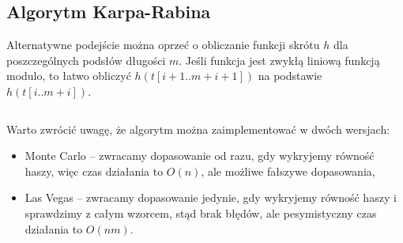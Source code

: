 \subsection{Algorytm Karpa-Rabina}

Alternatywne podejście można oprzeć o obliczanie funkcji skrótu $h$ dla poszczególnych podsłów długości $m$. Jeśli funkcja jest zwykłą liniową funkcją modulo, to łatwo obliczyć $h(t[i + 1..m + i + 1])$ na podstawie $h(t[i..m + i])$.

\begin{code}
\inputminted{python}{code/exact-string-matching/karp-rabin.py}
\label{alg:exact-string-matching-karp-rabin}
\end{code}

Warto zwrócić uwagę, że algorytm można zaimplementować w dwóch wersjach:
\begin{itemize}
    \item Monte Carlo -- zwracamy dopasowanie od razu, gdy wykryjemy równość haszy, więc czas działania to $O(n)$, ale możliwe fałszywe dopasowania,
    \item Las Vegas -- zwracamy dopasowanie jedynie, gdy wykryjemy równość haszy i sprawdzimy z całym wzorcem, stąd brak błędów, ale pesymistyczny czas działania to $O(n m)$.
\end{itemize}
